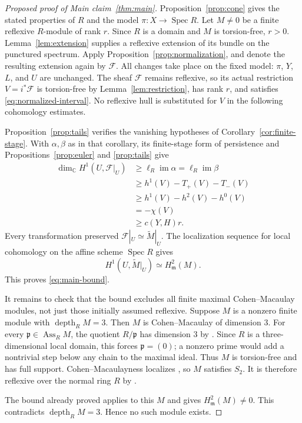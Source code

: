 \documentclass[11pt,reqno]{amsart}
\numberwithin{equation}{section}
\theoremstyle{definition}
\theoremstyle{remark}
\newcommand{\C}{\mathbb C}
\newcommand{\FF}{\mathcal F}
\newcommand{\mm}{\mathfrak m}
\newcommand{\Spec}{\operatorname{Spec}}
\newcommand{\depth}{\operatorname{depth}}
\newcommand{\Ass}{\operatorname{Ass}}
\newcommand{\im}{\operatorname{im}}
\newcommand{\len}{\ell}
\begin{document}
\begin{proof}[Proposed proof of Main claim~\ref{thm:main}]
Proposition~\ref{prop:cone} gives the stated properties of $R$ and
the model $\pi:X\to\Spec R$. Let $M\ne0$ be a finite reflexive
$R$-module of rank $r$. Since $R$ is a domain and $M$ is torsion-free,
$r>0$. Lemma~\ref{lem:extension} supplies a reflexive extension of
its bundle on the punctured spectrum. Apply
Proposition~\ref{prop:normalization}, and denote the resulting
extension again by $\FF$. All changes take place on the fixed model:
$\pi$, $Y$, $L$, and $U$ are unchanged. The sheaf $\FF$ remains
reflexive, so its actual restriction $V=i^*\FF$ is torsion-free by
Lemma~\ref{lem:restriction}, has rank $r$, and satisfies
\eqref{eq:normalized-interval}. No reflexive hull is substituted for
$V$ in the following cohomology estimates.

Proposition~\ref{prop:tails} verifies the vanishing hypotheses of
Corollary~\ref{cor:finite-stage}. With $\alpha,\beta$ as in that corollary,
its finite-stage form of persistence and
Propositions~\ref{prop:euler} and \ref{prop:tails} give
\begin{align*}
 \dim_\C H^1(U,\FF|_U)
 &\geq\len_R\im\alpha=\len_R\im\beta\\
 &\geq h^1(V)-T_+(V)-T_-(V)\\
 &\geq h^1(V)-h^2(V)-h^0(V)\\
 &=-\chi(V)\\
 &\geq c(Y,H)r.
\end{align*}
Every transformation preserved $\FF|_U\simeq\widetilde M|_U$.
The localization sequence for local cohomology on the affine scheme
$\Spec R$ gives
\begin{equation}\label{eq:local-cohomology-identification}
 H^1(U,\widetilde M|_U)\simeq H^2_\mm(M).
\end{equation}
This proves \eqref{eq:main-bound}.

It remains to check that the bound excludes all finite maximal
Cohen--Macaulay modules, not just those initially assumed reflexive.
Suppose $M$ is a nonzero finite module with $\depth_R M=3$.
Then $M$ is Cohen--Macaulay of dimension $3$. For every
$\mathfrak p\in\Ass_R M$, the quotient $R/\mathfrak p$ has
dimension $3$ by \cite[Tag 0BUS]{Stacks}.
Since $R$ is a three-dimensional local domain, this
forces $\mathfrak p=(0)$; a nonzero prime would add a nontrivial step
below any chain to the maximal ideal. Thus $M$ is torsion-free and
has full support. Cohen--Macaulayness localizes
\cite[Tag 0AAG]{Stacks}, so $M$ satisfies $S_2$.
It is therefore reflexive over the normal ring $R$ by
\cite[Tag 0AVB]{Stacks}.

The bound already proved applies to this $M$ and gives
$H^2_\mm(M)\ne0$. This contradicts $\depth_R M=3$. Hence no such
module exists.
\end{proof}
\end{document}
